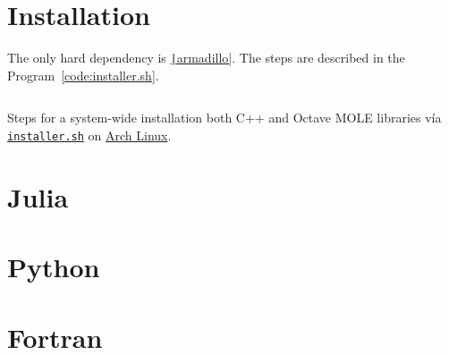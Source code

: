 \documentclass[a4paper,abstract=true]{scrreprt}
\begin{document}
\appendix

\chapter{Installation}

The only hard dependency is
\href{https://arma.sourceforge.net/docs.html}{\texttt|armadillo|}.
The steps are described in the Program~\ref{code:installer.sh}.

\begin{listing}[ht!]
	\tiny
	\centering
	\inputminted[frame=single,framesep=10pt,linenos,firstline=1,lastline=18,highlightlines={9,15}]{bash}{installer.sh}
	\caption{Steps for a system-wide installation both C++ and Octave
		MOLE libraries vía \href{https://raw.githubusercontent.com/carlosal1015/mole_examples/main/homework/installer.sh}{\texttt{installer.sh}} on
		\href{https://archlinux.org}{Arch Linux}.}
	\label{code:installer.sh}
\end{listing}

\chapter{Julia}

\chapter{Python}

\chapter{Fortran}

\nocite{*}
\printbibliography[title={References}]
\end{document}
